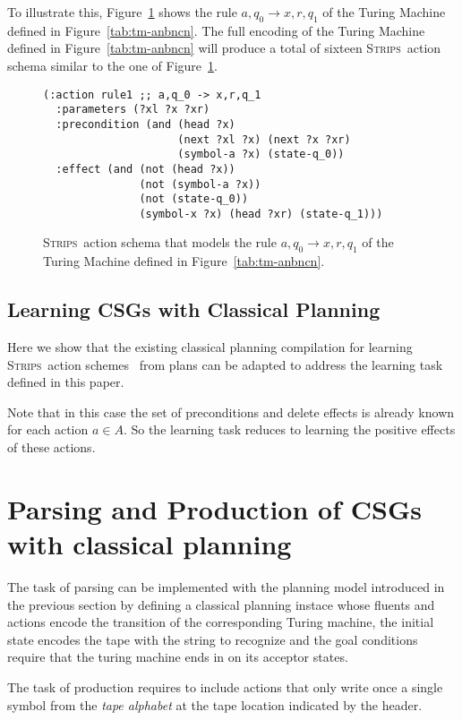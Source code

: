 \documentclass[letterpaper]{article} %
\newcommand{\strips}{\textsc{Strips}}     %
\begin{document}
To illustrate this, Figure~\ref{fig:update-rule} shows the rule $a,q_0\rightarrow x,r,q_1$ of the Turing Machine defined in Figure~\ref{tab:tm-anbncn}. The full encoding of the Turing Machine defined in Figure~\ref{tab:tm-anbncn} will produce a total of sixteen \strips\ action schema similar to the one of Figure~\ref{fig:update-rule}. 
\begin{figure}[hbt!]
\begin{footnotesize}
\begin{verbatim}
(:action rule1 ;; a,q_0 -> x,r,q_1
  :parameters (?xl ?x ?xr)
  :precondition (and (head ?x) 
                     (next ?xl ?x) (next ?x ?xr) 
                     (symbol-a ?x) (state-q_0))
  :effect (and (not (head ?x)) 
               (not (symbol-a ?x)) 
               (not (state-q_0))
               (symbol-x ?x) (head ?xr) (state-q_1)))
\end{verbatim}
\end{footnotesize}
 \caption{\small \strips\ action schema that models the rule $a,q_0\rightarrow x,r,q_1$ of the Turing Machine defined in Figure~\ref{tab:tm-anbncn}.}
\label{fig:update-rule}
\end{figure}

\subsection{Learning CSGs with Classical Planning}
Here we show that the existing classical planning compilation for learning \strips\ action schemes~\cite{aineto:learningSTRIPS:ICAPS2018} from plans can be adapted to address the learning task defined in this paper.

Note that in this case the set of preconditions and delete effects is already known for each action $a\in A$. So the learning task reduces to learning the positive effects of these actions.

\section{Parsing and Production of CSGs with classical planning}
The task of parsing can be implemented with the planning model introduced in the previous section by defining a classical planning instace whose fluents and actions encode the transition of the corresponding Turing machine, the initial state encodes the tape with the string to recognize and the goal conditions require that the turing machine ends in on its acceptor states.

The task of production requires to include actions that only write once a single symbol from the {\em tape alphabet} at the tape location indicated by the header.
\end{document}
